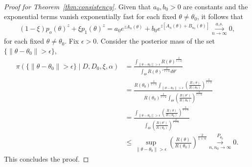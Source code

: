 \documentclass[12pt]{article}
\begin{document}
\begin{proof}[Proof for Theorem~\ref{thm:consistency}]
    Given that $a_0, b_0 > 0$ are constants and the exponential terms vanish exponentially fast for each fixed $\theta \neq \theta_0$, it follows that
    \begin{align*}
        (1 - \xi)p_o(\theta)^z + \xi p_1(\theta)^z = a_0 e^{z A_n(\theta)} + b_0 e^{z[A_n(\theta) + B_{n_0}(\theta)]} \overset{a.s.}{\underset{n\to\infty}{\to}} 0,
    \end{align*}
    for each fixed $\theta \neq \theta_0$.
    Fix $\epsilon > 0$.
    Consider the posterior mass of the set $\{\|\theta - \theta_0\| > \epsilon\}$,
    \begin{align*}
        \pi\left(\{\|\theta - \theta_0\| > \epsilon\} \mid D, D_0, \xi, \alpha\right) &= \frac{\int_{\|\theta - \theta_0\| > \epsilon}R(\theta)^{\frac{2}{1 + \alpha}}}{\int_\Theta R(\theta)'^{\frac{2}{1+\alpha}}d\theta'} \\
        &= \frac{R(\theta_0)^{\frac{2}{1+\alpha}}\int_{\|\theta - \theta_0\| > \epsilon}\left(\frac{R(\theta)}{R(\theta_0)}\right)^{\frac{2}{1+\alpha}}}{R(\theta_0)^{\frac{2}{1+\alpha}}\int_\Theta\left(\frac{R(\theta')}{R(\theta_0)}\right)^{\frac{2}{1+\alpha}}} \\
        &= \frac{\int_{\|\theta - \theta_0\| > \epsilon}\left(\frac{R(\theta)}{R(\theta_0)}\right)^{\frac{2}{1+\alpha}}}{\int_\Theta\left(\frac{R(\theta')}{R(\theta_0)}\right)^{\frac{2}{1+\alpha}}} \\
        &\leq \sup_{\|\theta - \theta_0\| > \epsilon}\left(\frac{R(\theta)}{R(\theta_0)}\right)^{\frac{2}{1+\alpha}} \overset{P_{\theta_0}}{\underset{n,n_0\to\infty}{\to}} 0.
    \end{align*}
    This concludes the proof.
\end{proof}
\end{document}
